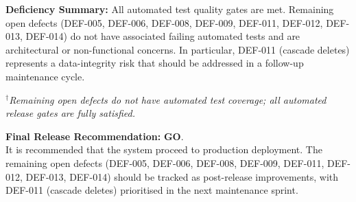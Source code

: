 \documentclass[11pt,a4paper]{article}
\begin{document}
\textbf{Deficiency Summary:} All automated test quality gates are met. Remaining open defects (DEF-005, DEF-006, DEF-008, DEF-009, DEF-011, DEF-012, DEF-013, DEF-014) do not have associated failing automated tests and are architectural or non-functional concerns. In particular, DEF-011 (cascade deletes) represents a data-integrity risk that should be addressed in a follow-up maintenance cycle.

$^{\dagger}$\textit{Remaining open defects do not have automated test coverage; all automated release gates are fully satisfied.}

\textbf{Final Release Recommendation:} \textbf{GO}. \\
It is recommended that the system proceed to production deployment. The remaining open defects (DEF-005, DEF-006, DEF-008, DEF-009, DEF-011, DEF-012, DEF-013, DEF-014) should be tracked as post-release improvements, with DEF-011 (cascade deletes) prioritised in the next maintenance sprint.


\end{document}
